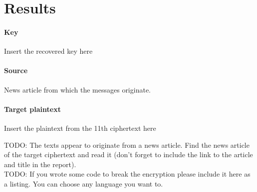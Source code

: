 \documentclass{scrartcl}
\newcommand\solution[2]{{\paragraph{#1}#2}}
\newcommand\todo[1]{TODO: #1}
\begin{document}
\section*{Results}
\solution{Key}{Insert the recovered key here}
\solution{Source}{News article from which the messages originate.}
\solution{Target plaintext}{Insert the plaintext from the 11th ciphertext here}

\todo{The texts appear to originate from a news article. Find the news article
of the target ciphertext and read it (don't forget to include the link to the
article and title in the report).}\\
\todo{If you wrote some code to break the encryption please include it here as
a listing. You can choose any language you want to.}
\end{document}
